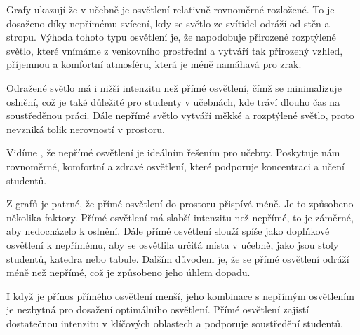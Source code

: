 
Grafy ukazují že v učebně je osvětlení relativně rovnoměrné rozložené.
To je dosaženo díky nepřímému svícení, kdy se světlo ze svítidel odráží od stěn a stropu.
Výhoda tohoto typu osvětlení je, že napodobuje přirozené rozptýlené světlo, které vnímáme z venkovního prostřední
a vytváří tak přirozený vzhled, příjemnou a komfortní atmosféru, která je méně namáhavá pro zrak.

Odražené světlo má i nižší intenzitu než přímé osvětlení, čímž se minimalizuje oslnění, což je také důležité pro
studenty v učebnách, kde tráví dlouho čas na soustředěnou práci.
Dále nepřímé světlo vytváří měkké a rozptýlené světlo, proto nevzniká tolik nerovností v prostoru.

Vidíme , že nepřímé osvětlení je ideálním řešením pro učebny. Poskytuje nám rovnoměrné,
komfortní a zdravé osvětlení, které podporuje koncentraci a učení studentů.

\medskip {}

Z grafů je patrné, že přímé osvětlení do prostoru přispívá méně. Je to způsobeno několika faktory.
Přímé osvětlení má slabší intenzitu než nepřímé, to je záměrné, aby nedocházelo k oslnění.
Dále přímé osvětlení slouží spíše jako doplňkové osvětlení k nepřímému, aby se osvětlila určitá místa v učebně,
jako jsou stoly studentů, katedra nebo tabule. Dalším důvodem je, že se přímé osvětlení odráží
méně než nepřímé, což je způsobeno jeho úhlem dopadu.

I když je přínos přímého osvětlení menší, jeho kombinace s nepřímým osvětlením je nezbytná pro dosažení
optimálního osvětlení. Přímé osvětlení zajistí dostatečnou intenzitu v klíčových oblastech a podporuje soustředění studentů.







